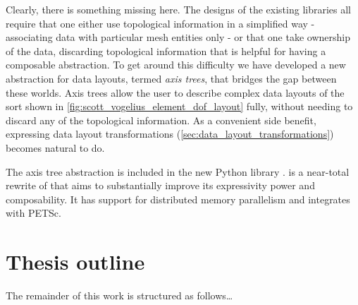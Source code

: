 \documentclass[thesis]{subfiles}
\begin{document}
Clearly, there is something missing here.
The designs of the existing libraries all require that one either use topological information in a simplified way - associating data with particular mesh entities only - or that one take ownership of the data, discarding topological information that is helpful for having a composable abstraction.
To get around this difficulty we have developed a new abstraction for data layouts, termed \textit{axis trees}, that bridges the gap between these worlds.
Axis trees allow the user to describe complex data layouts of the sort shown in \cref{fig:scott_vogelius_element_dof_layout} fully, without needing to discard any of the topological information.
As a convenient side benefit, expressing data layout transformations (\cref{sec:data_layout_transformations}) becomes natural to do.

The axis tree abstraction is included in the new Python library .
 is a near-total rewrite of  that aims to substantially improve its expressivity power and composability.
It has support for distributed memory parallelism and integrates with PETSc.

\section{Thesis outline}

The remainder of this work is structured as follows\dots
\end{document}

